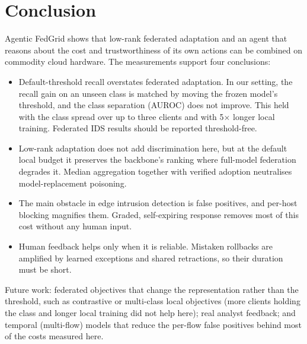 \documentclass[conference]{IEEEtran}
\begin{document}
\section{Conclusion}
Agentic FedGrid shows that low-rank federated adaptation and an agent that
reasons about the cost and trustworthiness of its own actions can be combined
on commodity cloud hardware. The measurements support four conclusions:
\begin{itemize}
\item Default-threshold recall overstates federated adaptation. In our
setting, the recall gain on an unseen class is matched by moving the frozen
model's threshold, and the class separation (AUROC) does not improve. This
held with the class spread over up to three clients and with 5$\times$ longer
local training. Federated IDS results should be reported threshold-free.
\item Low-rank adaptation does not add discrimination here, but at the default
local budget it preserves the backbone's ranking where full-model federation
degrades it. Median
aggregation together with verified adoption neutralises model-replacement
poisoning.
\item The main obstacle in edge intrusion detection is false positives, and
per-host blocking magnifies them. Graded, self-expiring response removes most
of this cost without any human input.
\item Human feedback helps only when it is reliable. Mistaken rollbacks are
amplified by learned exceptions and shared retractions, so their duration
must be short.
\end{itemize}
Future work: federated objectives that change the representation rather than
the threshold, such as contrastive or multi-class local objectives (more
clients holding the class and longer local training did not help here); real
analyst feedback; and temporal (multi-flow)
models that reduce the per-flow false positives behind most of the costs
measured here.
\end{document}
